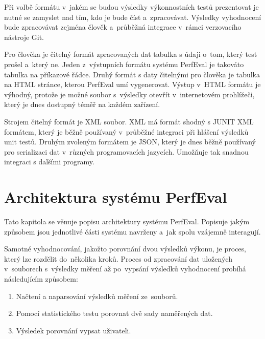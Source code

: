 Při volbě formátu v~jakém se budou výsledky výkonnostních testů prezentovat je nutné se zamyslet nad tím, kdo je bude číst a~zpracovávat.
Výsledky vyhodnocení bude zpracovávat zejména člověk a~průběžná integrace v~rámci verzovacího nástroje Git.

Pro člověka je čitelný formát zpracovaných dat tabulka s údaji o~tom, který test prošel a~který ne.
Jeden z~výstupních formátu systému PerfEval je takováto tabulka na příkazové řádce. Druhý formát s daty čitelnými pro člověka je
tabulka na HTML stránce, kterou PerfEval umí vygenerovat. Výstup v~HTML formátu je výhodný, protože je možné
soubor s~výsledky otevřít v~internetovém prohlížeči, který je dnes dostupný téměř na každém zařízení.

Strojem čitelný formát je XML soubor. XML má formát shodný s JUNIT XML formátem, který je běžně používaný v~průběžné integraci
při hlášení výsledků unit testů. Druhým zvoleným formátem je JSON, který je dnes běžně používaný pro serializaci dat v~různých
programovacích jazycích. Umožňuje tak snadnou integraci s dalšími programy.

\section{Architektura systému PerfEval}

Tato kapitola se věnuje popisu architektury systému PerfEval.
Popisuje jakým způsobem jsou jednotlivé části systému navrženy a~jak spolu vzájemně interagují.

Samotné vyhodnocování, jakožto porovnání dvou výsledků výkonu, je proces, který lze rozdělit do~několika kroků.
Proces od zpracování dat uložených v~souborech s~výsledky měření až po~vypsání výsledků vyhodnocení probíhá následujícím způsobem:

\begin{enumerate}
    \item Načtení a naparsování výsledků měření ze~souborů.
    \item Pomocí statistického testu porovnat dvě sady naměřených dat.
    \item Výsledek porovnání vypsat uživateli.
\end{enumerate}

